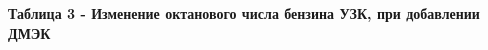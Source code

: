 {\bfseries Таблица 3 - Изменение октанового числа бензина УЗК, при
добавлении ДМЭК}

% 
% 
% 
% 
% 
